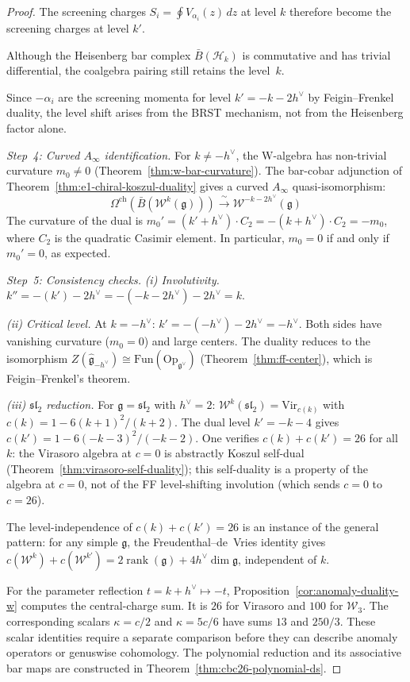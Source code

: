 \begin{proof}
The screening charges $S_i = \oint V_{\alpha_i}(z)\,dz$ at level $k$
therefore become the screening charges at level $k'$.

Although the Heisenberg bar complex $\bar{B}(\mathcal{H}_k)$ is
commutative and has trivial differential, the coalgebra pairing still
retains the level~$k$.

Since $-\alpha_i$ are the screening momenta for level
$k' = -k-2h^\vee$ by Feigin--Frenkel duality, the level shift arises
from the BRST mechanism, not from the Heisenberg factor alone.

\emph{Step~4: Curved $A_\infty$ identification.}
For $k \neq -h^\vee$, the W-algebra has non-trivial curvature $m_0 \neq 0$ (Theorem~\ref{thm:w-bar-curvature}). The bar-cobar adjunction of Theorem~\ref{thm:e1-chiral-koszul-duality} gives a curved $A_\infty$ quasi-isomorphism:
\[
\Omega^{\mathrm{ch}}(\bar{B}(\mathcal{W}^k(\mathfrak{g}))) \xrightarrow{\;\sim\;} \mathcal{W}^{-k-2h^\vee}(\mathfrak{g})
\]
The curvature of the dual is $m_0' = (k' + h^\vee) \cdot C_2 = -(k + h^\vee) \cdot C_2 = -m_0$, where $C_2$ is the quadratic Casimir element.  In particular, $m_0 = 0$ if and only if $m_0' = 0$, as expected.

\emph{Step~5: Consistency checks.}
\emph{(i) Involutivity.}  $k'' = -(k') - 2h^\vee = -(-k-2h^\vee) - 2h^\vee = k$. \checkmark

\emph{(ii) Critical level.}  At $k = -h^\vee$: $k' = -(-h^\vee) - 2h^\vee = -h^\vee$. Both sides have vanishing curvature ($m_0 = 0$) and large centers.  The duality reduces to the isomorphism $Z(\widehat{\mathfrak{g}}_{-h^\vee}) \cong \mathrm{Fun}(\mathrm{Op}_{\mathfrak{g}^\vee})$ (Theorem~\ref{thm:ff-center}), which is Feigin--Frenkel's theorem. \checkmark

\emph{(iii) $\mathfrak{sl}_2$ reduction.}  For $\mathfrak{g} = \mathfrak{sl}_2$ with $h^\vee = 2$: $\mathcal{W}^k(\mathfrak{sl}_2) = \mathrm{Vir}_{c(k)}$ with $c(k) = 1 - 6(k+1)^2/(k+2)$.  The dual level $k' = -k-4$ gives $c(k') = 1 - 6(-k-3)^2/(-k-2)$.  One verifies $c(k) + c(k') = 26$ for all $k$: the Virasoro algebra at $c = 0$ is abstractly Koszul self-dual (Theorem~\ref{thm:virasoro-self-duality}); this self-duality is a property of the algebra at $c=0$, not of the FF level-shifting involution (which sends $c=0$ to $c=26$). \checkmark

The level-independence of $c(k) + c(k') = 26$ is an instance of the
general pattern: for any simple $\mathfrak{g}$, the Freudenthal--de~Vries
identity gives $c(\mathcal{W}^k) + c(\mathcal{W}^{k'})
= 2\operatorname{rank}(\mathfrak{g}) + 4h^\vee\dim\mathfrak{g}$,
independent of $k$.

For the parameter reflection $t=k+h^\vee\mapsto-t$, Proposition~\ref{cor:anomaly-duality-w} computes the central-charge sum.
It is $26$ for Virasoro and $100$ for $\mathcal W_3$.
The corresponding scalars $\kappa=c/2$ and $\kappa=5c/6$ have sums $13$ and $250/3$.
These scalar identities require a separate comparison before they can describe anomaly operators or genuswise cohomology.
The polynomial reduction and its associative bar maps are constructed in Theorem~\ref{thm:cbc26-polynomial-ds}.
\end{proof}

